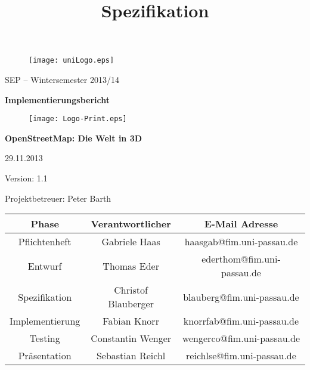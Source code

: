 \documentclass[10pt]{scrreprt}
\begin{document}
\thispagestyle{empty}
\sffamily
 
\title{Spezifikation}

\begin{figure}
\begin{flushright}
	\texttt{[image: uniLogo.eps]}
\vspace{2.0 cm}
\end{flushright}
\end{figure}

\begin{center}
\vspace{2.0 cm}
{\LARGE SEP – Wintersemester 2013/14}

\vspace{1.0 cm}
\textbf{{\Huge Implementierungsbericht}}

\vspace{0.4 cm}
\begin{figure}[!htb]
\begin{center}
	\texttt{[image: Logo-Print.eps]}
\end{center}
\end{figure}

\vspace{0.2 cm}
\textbf{{\huge OpenStreetMap: Die Welt in 3D}}

\vspace{1.5 cm}
29.11.2013

\vspace{0.5 cm}
Version: 1.1

\vspace{1.5 cm}
{\Large Projektbetreuer: Peter Barth}

\vspace{1.5 cm}
\begin{tabular}{|c|c|c|}
\hline 
\rule[-1ex]{0pt}{4ex} \textbf{Phase} & \textbf{Verantwortlicher} & \textbf{E-Mail Adresse} \\ 
\hline  \hline
\rule[-1ex]{0pt}{4ex} Pflichtenheft & Gabriele Haas & haasgab@fim.uni-passau.de \\ 
\hline  \hline
\rule[-1ex]{0pt}{4ex} Entwurf & Thomas Eder & ederthom@fim.uni-passau.de \\ 
\hline  \hline
\rule[-1ex]{0pt}{4ex} Spezifikation & Christof Blauberger & blauberg@fim.uni-passau.de \\ 
\hline  \hline
\rule[-1ex]{0pt}{4ex} Implementierung & Fabian Knorr & knorrfab@fim.uni-passau.de \\ 
\hline \hline 
\rule[-1ex]{0pt}{4ex} Testing & Constantin Wenger & wengerco@fim.uni-passau.de \\ 
\hline  \hline
\rule[-1ex]{0pt}{4ex} Präsentation & Sebastian Reichl & reichlse@fim.uni-passau.de \\ 
\hline 
\end{tabular}

\end{center}
\end{document}
